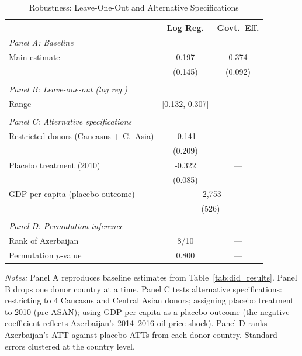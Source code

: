 \begin{table}[htbp]
\centering
\caption{Robustness: Leave-One-Out and Alternative Specifications}
\label{tab:robustness}
\begin{tabular}{lcc}
\hline\hline
 & Log Reg. & Govt.\ Eff. \\
\hline
\textit{Panel A: Baseline} & & \\
\quad Main estimate & 0.197 & 0.374 \\
\quad & (0.145) & (0.092) \\
 & & \\
\textit{Panel B: Leave-one-out (log reg.)} & & \\
\quad Range & [0.132, 0.307] & --- \\
 & & \\
\textit{Panel C: Alternative specifications} & & \\
\quad Restricted donors (Caucasus + C.\ Asia) & -0.141 & --- \\
\quad & (0.209) & \\
\quad Placebo treatment (2010) & -0.322 & --- \\
\quad & (0.085) & \\
\quad GDP per capita (placebo outcome) & \multicolumn{2}{c}{-2,753} \\
\quad & \multicolumn{2}{c}{(526)} \\
 & & \\
\textit{Panel D: Permutation inference} & & \\
\quad Rank of Azerbaijan & 8/10 & --- \\
\quad Permutation $p$-value & 0.800 & --- \\
\hline\hline
\end{tabular}
\par\vspace{0.3em}
{\footnotesize \textit{Notes:} Panel A reproduces baseline estimates from Table~\ref{tab:did_results}. Panel B drops one donor country at a time. Panel C tests alternative specifications: restricting to 4 Caucasus and Central Asian donors; assigning placebo treatment to 2010 (pre-ASAN); using GDP per capita as a placebo outcome (the negative coefficient reflects Azerbaijan's 2014--2016 oil price shock). Panel D ranks Azerbaijan's ATT against placebo ATTs from each donor country. Standard errors clustered at the country level.}
\end{table}
